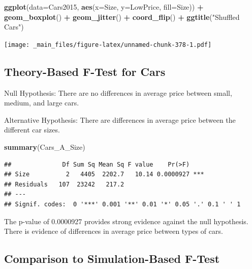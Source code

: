 \documentclass[]{book}
\newenvironment{Shaded}{\begin{snugshade}}{\end{snugshade}}
\newcommand{\KeywordTok}[1]{\textcolor[rgb]{0.13,0.29,0.53}{\textbf{#1}}}
\newcommand{\DataTypeTok}[1]{\textcolor[rgb]{0.13,0.29,0.53}{#1}}
\newcommand{\StringTok}[1]{\textcolor[rgb]{0.31,0.60,0.02}{#1}}
\newcommand{\OperatorTok}[1]{\textcolor[rgb]{0.81,0.36,0.00}{\textbf{#1}}}
\newcommand{\NormalTok}[1]{#1}
\begin{document}
\begin{Shaded}
\begin{Highlighting}[]
\KeywordTok{ggplot}\NormalTok{(}\DataTypeTok{data=}\NormalTok{Cars2015, }\KeywordTok{aes}\NormalTok{(}\DataTypeTok{x=}\NormalTok{Size, }\DataTypeTok{y=}\NormalTok{LowPrice, }\DataTypeTok{fill=}\NormalTok{Size)) }\OperatorTok{+}\StringTok{ }
\StringTok{  }\KeywordTok{geom_boxplot}\NormalTok{() }\OperatorTok{+}\StringTok{ }\KeywordTok{geom_jitter}\NormalTok{() }\OperatorTok{+}\StringTok{ }\KeywordTok{coord_flip}\NormalTok{() }\OperatorTok{+}\StringTok{ }\KeywordTok{ggtitle}\NormalTok{(}\StringTok{"Shuffled Cars"}\NormalTok{)}
\end{Highlighting}
\end{Shaded}

\texttt{[image: \_main\_files/figure-latex/unnamed-chunk-378-1.pdf]}

\subsection{Theory-Based F-Test for
Cars}\label{theory-based-f-test-for-cars}

Null Hypothesis: There are no differences in average price between
small, medium, and large cars.

Alternative Hypothesis: There are differences in average price between
the different car sizes.

\begin{Shaded}
\begin{Highlighting}[]
\KeywordTok{summary}\NormalTok{(Cars_A_Size)}
\end{Highlighting}
\end{Shaded}

\begin{verbatim}
##              Df Sum Sq Mean Sq F value    Pr(>F)    
## Size          2   4405  2202.7   10.14 0.0000927 ***
## Residuals   107  23242   217.2                      
## ---
## Signif. codes:  0 '***' 0.001 '**' 0.01 '*' 0.05 '.' 0.1 ' ' 1
\end{verbatim}

The p-value of 0.0000927 provides strong evidence against the null
hypothesis. There is evidence of differences in average price between
types of cars.

\subsection{Comparison to Simulation-Based
F-Test}\label{comparison-to-simulation-based-f-test}
\end{document}

